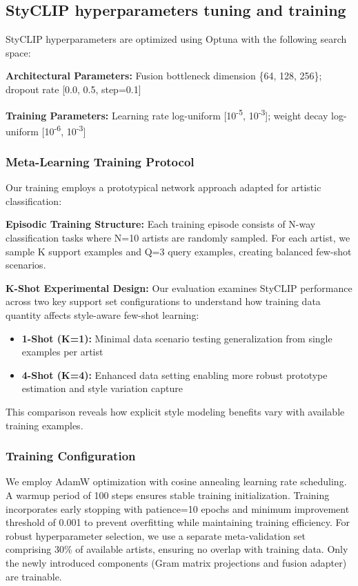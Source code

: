 \documentclass[conference,6pt]{IEEEtran}
\begin{document}
\subsection{StyCLIP hyperparameters tuning and training}

StyCLIP hyperparameters are optimized using Optuna \cite{Optuna} with the following search space:

\textbf{Architectural Parameters:} Fusion bottleneck dimension \{64, 128, 256\}; dropout rate [0.0, 0.5, step=0.1]

\textbf{Training Parameters:} Learning rate log-uniform [10\textsuperscript{-5}, 10\textsuperscript{-3}]; weight decay log-uniform [10\textsuperscript{-6}, 10\textsuperscript{-3}]

\subsubsection{Meta-Learning Training Protocol}

Our training employs a prototypical network \cite{ProtoNet} approach adapted for artistic classification:

\textbf{Episodic Training Structure:} Each training episode consists of N-way classification tasks where N=10 artists are randomly sampled. For each artist, we sample K support examples and Q=3 query examples, creating balanced few-shot scenarios.

\textbf{K-Shot Experimental Design:} Our evaluation examines StyCLIP performance across two key support set configurations to understand how training data quantity affects style-aware few-shot learning:

\begin{itemize}
    \item \textbf{1-Shot (K=1):} Minimal data scenario testing generalization from single examples per artist
    \item \textbf{4-Shot (K=4):} Enhanced data setting enabling more robust prototype estimation and style variation capture
\end{itemize}

This comparison reveals how explicit style modeling benefits vary with available training examples.

\subsubsection{Training Configuration}
We employ AdamW optimization with cosine annealing learning rate scheduling. A warmup period of 100 steps ensures stable training initialization. Training incorporates early stopping with patience=10 epochs and minimum improvement threshold of 0.001 to prevent overfitting while maintaining training efficiency. For robust hyperparameter selection, we use a separate meta-validation set comprising 30\% of available artists, ensuring no overlap with training data. Only the newly introduced components (Gram matrix projections and fusion adapter) are trainable. 
\end{document}
